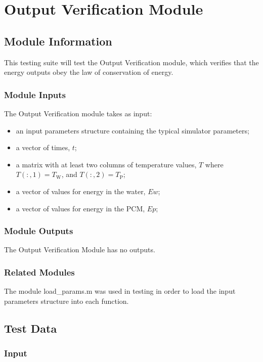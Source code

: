 \documentclass[12pt]{article}
\begin{document}
\section{Output Verification Module}

\subsection{Module Information}
This testing suite will test the Output Verification module, which verifies that the energy outputs obey the law of conservation of energy.

\subsubsection{Module Inputs}
The Output Verification module takes as input:
\begin{itemize}
	\item an input parameters structure containing the typical simulator parameters;
	\item a vector of times, $t$;
	\item a matrix with at least two columns of temperature values, $T$ where $T(:,1) = T_{\text{W}}$, and $T(:,2) = T_{\text{P}}$;
	\item a vector of values for energy in the water, $Ew$;
	\item a vector of values for energy in the PCM, $Ep$;
\end{itemize}

\subsubsection{Module Outputs}
The Output Verification Module has no outputs.

\subsubsection{Related Modules}
The module load\_params.m was used in testing in order to load the input parameters 
structure into each function.

\subsection{Test Data}

\subsubsection{Input}
\end{document}
